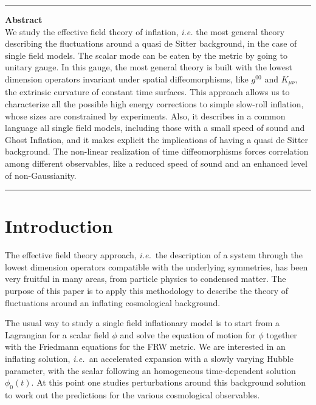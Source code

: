 \documentclass[12pt,letterpaper]{article}
\begin{document}
\hrule \vspace{0.3cm}
{\small  \noindent \textbf{Abstract} \\[0.3cm]
\noindent
We study the effective field theory of inflation, {\em
  i.e.} the most general theory describing the fluctuations around a
quasi de Sitter background, in the case of single field models. The scalar mode can
be eaten by the metric by going to unitary gauge. In this gauge, the most
general theory is built with the lowest dimension operators invariant
under spatial diffeomorphisms, like $g^{00}$ and $K_{\mu\nu}$, the
extrinsic curvature of constant time surfaces. This approach allows us to
characterize all the possible high energy corrections to simple
slow-roll inflation, whose sizes are constrained by experiments. 
Also, it describes in a common language all single field models, including
those with a small speed of sound and Ghost Inflation, and it 
makes explicit the implications of having a quasi de Sitter background.
The non-linear realization of time diffeomorphisms forces correlation
among different observables, like a reduced speed of sound and an enhanced level of non-Gaussianity.  
\vspace{0.5cm}  \hrule
\def\thefootnote{\arabic{footnote}}
\setcounter{footnote}{0}

\section{Introduction}
The effective field theory approach, {\em i.e.}~the description of a system through the lowest dimension operators compatible with the underlying symmetries, has been very fruitful in many areas, from particle physics to condensed matter. The purpose of this paper is to apply this methodology to describe the theory of fluctuations around an inflating cosmological background.

The usual way to study a single field inflationary model is to start from a Lagrangian for a scalar field $\phi$ and solve the equation of motion for $\phi$ together with the Friedmann equations for the FRW metric. We are interested in an inflating solution, {\em i.e.~}an accelerated expansion with a slowly varying Hubble parameter, with the scalar following an homogeneous time-dependent solution $\phi_0(t)$.
At this point one studies perturbations around this background solution to work out the predictions for the various cosmological observables.  

}
\end{document}
